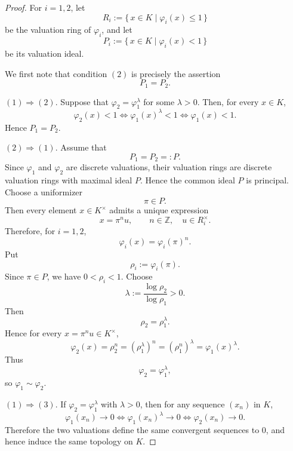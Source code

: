 \begin{proof}
    For \(i=1,2\), let
    \[
        R_i:=\{\,x\in K\mid \varphi_i(x)\leq 1\,\}
    \]
    be the valuation ring of \(\varphi_i\), and let
    \[
        P_i:=\{\,x\in K\mid \varphi_i(x)<1\,\}
    \]
    be its valuation ideal.

    We first note that condition \((2)\) is precisely the assertion
    \[
        P_1=P_2.
    \]

    \((1)\Rightarrow (2)\).
    Suppose that \(\varphi_2=\varphi_1^\lambda\) for some \(\lambda>0\). Then, for every
    \(x\in K\),
    \[
        \varphi_2(x)<1
        \Longleftrightarrow
        \varphi_1(x)^\lambda<1
        \Longleftrightarrow
        \varphi_1(x)<1.
    \]
    Hence \(P_1=P_2\).

    \((2)\Rightarrow (1)\).
    Assume that
    \[
        P_1=P_2=:P.
    \]
    Since \(\varphi_1\) and \(\varphi_2\) are discrete valuations, their valuation rings
    are discrete valuation rings with maximal ideal \(P\). Hence the common ideal \(P\)
    is principal. Choose a uniformizer
    \[
        \pi\in P.
    \]
    Then every element \(x\in K^\times\) admits a unique expression
    \[
        x=\pi^n u,
        \qquad n\in \mathbb Z,\quad u\in R_i^\times.
    \]
    Therefore, for \(i=1,2\),
    \[
        \varphi_i(x)=\varphi_i(\pi)^n.
    \]
    Put
    \[
        \rho_i:=\varphi_i(\pi).
    \]
    Since \(\pi\in P\), we have \(0<\rho_i<1\). Choose
    \[
        \lambda:=\frac{\log \rho_2}{\log \rho_1}>0.
    \]
    Then
    \[
        \rho_2=\rho_1^\lambda.
    \]
    Hence for every \(x=\pi^n u\in K^\times\),
    \[
        \varphi_2(x)
        =
        \rho_2^n
        =
        (\rho_1^\lambda)^n
        =
        (\rho_1^n)^\lambda
        =
        \varphi_1(x)^\lambda.
    \]
    Thus
    \[
        \varphi_2=\varphi_1^\lambda,
    \]
    so \(\varphi_1\sim \varphi_2\).

    \((1)\Rightarrow (3)\).
    If \(\varphi_2=\varphi_1^\lambda\) with \(\lambda>0\), then for any sequence
    \((x_n)\) in \(K\),
    \[
        \varphi_1(x_n)\to 0
        \Longleftrightarrow
        \varphi_1(x_n)^\lambda\to 0
        \Longleftrightarrow
        \varphi_2(x_n)\to 0.
    \]
    Therefore the two valuations define the same convergent sequences to \(0\), and hence
    induce the same topology on \(K\).


\end{proof}
